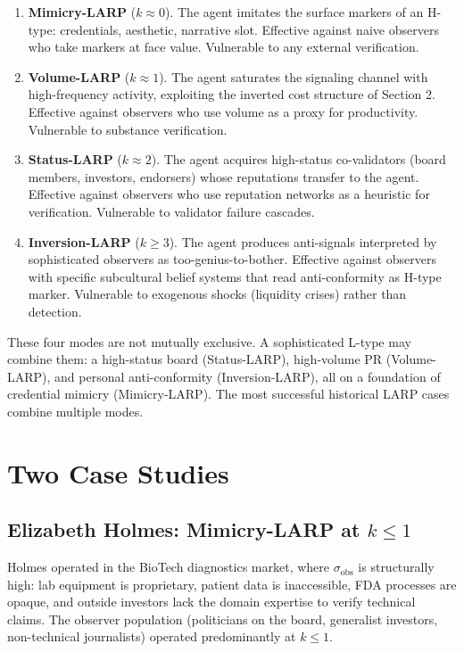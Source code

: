 \documentclass[11pt]{article}
\begin{document}
\begin{enumerate}
\item \textbf{Mimicry-LARP} ($k \approx 0$). The agent imitates the surface markers of an H-type: credentials, aesthetic, narrative slot. Effective against naive observers who take markers at face value. Vulnerable to any external verification.

\item \textbf{Volume-LARP} ($k \approx 1$). The agent saturates the signaling channel with high-frequency activity, exploiting the inverted cost structure of Section 2. Effective against observers who use volume as a proxy for productivity. Vulnerable to substance verification.

\item \textbf{Status-LARP} ($k \approx 2$). The agent acquires high-status co-validators (board members, investors, endorsers) whose reputations transfer to the agent. Effective against observers who use reputation networks as a heuristic for verification. Vulnerable to validator failure cascades.

\item \textbf{Inversion-LARP} ($k \geq 3$). The agent produces anti-signals interpreted by sophisticated observers as too-genius-to-bother. Effective against observers with specific subcultural belief systems that read anti-conformity as H-type marker. Vulnerable to exogenous shocks (liquidity crises) rather than detection.
\end{enumerate}

These four modes are not mutually exclusive. A sophisticated L-type may combine them: a high-status board (Status-LARP), high-volume PR (Volume-LARP), and personal anti-conformity (Inversion-LARP), all on a foundation of credential mimicry (Mimicry-LARP). The most successful historical LARP cases combine multiple modes.

\section{Two Case Studies}

\subsection{Elizabeth Holmes: Mimicry-LARP at $k \leq 1$}

Holmes operated in the BioTech diagnostics market, where $\sigma_{\mathrm{obs}}$ is structurally high: lab equipment is proprietary, patient data is inaccessible, FDA processes are opaque, and outside investors lack the domain expertise to verify technical claims. The observer population (politicians on the board, generalist investors, non-technical journalists) operated predominantly at $k \leq 1$.
\end{document}
